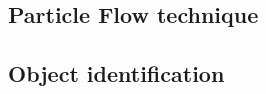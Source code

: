 


 

\subsection{Particle Flow technique \label{sec:event_reco_pf}}


\subsection{Object identification}

